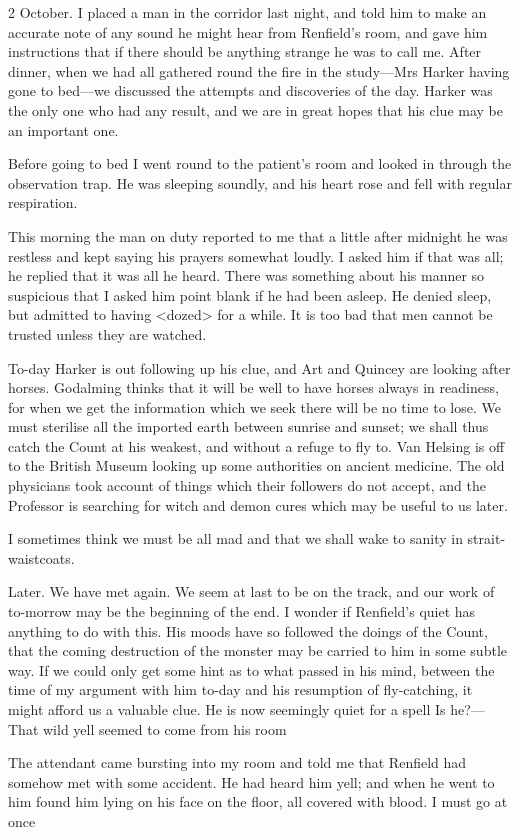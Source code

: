 \begin{diary}{2 October.}
I placed a man in the corridor last night, and told him to make an accurate note of any sound he might hear from Renfield's room, and gave him instructions that if there should be anything strange he was to call me. After dinner, when we had all gathered round the fire in the study—Mrs Harker having gone to bed—we discussed the attempts and discoveries of the day. Harker was the only one who had any result, and we are in great hopes that his clue may be an important one.

Before going to bed I went round to the patient's room and looked in through the observation trap. He was sleeping soundly, and his heart rose and fell with regular respiration.

This morning the man on duty reported to me that a little after midnight he was restless and kept saying his prayers somewhat loudly. I asked him if that was all; he replied that it was all he heard. There was something about his manner so suspicious that I asked him point blank if he had been asleep. He denied sleep, but admitted to having <dozed> for a while. It is too bad that men cannot be trusted unless they are watched.

To-day Harker is out following up his clue, and Art and Quincey are looking after horses. Godalming thinks that it will be well to have horses always in readiness, for when we get the information which we seek there will be no time to lose. We must sterilise all the imported earth between sunrise and sunset; we shall thus catch the Count at his weakest, and without a refuge to fly to. Van Helsing is off to the British Museum looking up some authorities on ancient medicine. The old physicians took account of things which their followers do not accept, and the Professor is searching for witch and demon cures which may be useful to us later.

I sometimes think we must be all mad and that we shall wake to sanity in strait-waistcoats.
\end{diary}
 

\begin{diary}{Later.}
We have met again. We seem at last to be on the track, and our work of to-morrow may be the beginning of the end. I wonder if Renfield's quiet has anything to do with this. His moods have so followed the doings of the Count, that the coming destruction of the monster may be carried to him in some subtle way. If we could only get some hint as to what passed in his mind, between the time of my argument with him to-day and his resumption of fly-catching, it might afford us a valuable clue. He is now seemingly quiet for a spell Is he?— That wild yell seemed to come from his room

 

The attendant came bursting into my room and told me that Renfield had somehow met with some accident. He had heard him yell; and when he went to him found him lying on his face on the floor, all covered with blood. I must go at once
\end{diary}